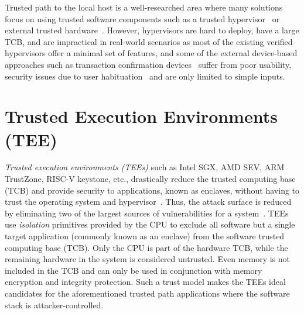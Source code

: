 Trusted path to the local host is a well-researched area where many solutions focus on using trusted software components such as a trusted hypervisor~\cite{zhou2012building} or external trusted hardware~\cite{filyanov2011uni,weigold2011secure,McCPerRei2006,mannan2007using,Fidelius}. However, hypervisors are hard to deploy, have a large TCB, and are impractical in real-world scenarios as most of the existing verified hypervisors offer a minimal set of features, and some of the external device-based approaches such as transaction confirmation devices~\cite{filyanov2011uni,weigold2011secure} suffer from poor usability, security issues due to user habituation~\cite{anderson2016warning} and are only limited to simple inputs.

 
\section{Trusted Execution Environments (TEE)}

\emph{Trusted execution environments (TEEs)} such as Intel SGX, AMD SEV, ARM TrustZone, RISC-V keystone, etc., drastically reduce the trusted computing base (TCB) and provide security to applications, known as enclaves, without having to trust the operating system and hypervisor~\cite{costan2016intel,winter2008trusted,costan2016sanctum}. Thus, the attack surface is reduced by eliminating two of the largest sources of vulnerabilities for a system~\cite{checkoway2013iago,suzaki2011memory}. TEEs use \emph{isolation} primitives provided by the CPU to exclude all software but a single target application (commonly known as an enclave) from the software trusted computing base (TCB). Only the CPU is part of the hardware TCB, while the remaining hardware in the system is considered untrusted. Even memory is not included in the TCB and can only be used in conjunction with memory encryption and integrity protection. Such a trust model makes the TEEs ideal candidates for the aforementioned trusted path applications where the software stack is attacker-controlled. 

